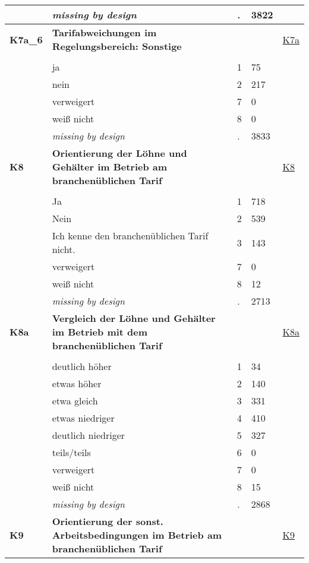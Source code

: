 \begin{longtable}{| L{2.65cm} | L{8cm} | C{1.5cm} | R{1.25cm} | C{2.25cm}  |}
   & \textit{missing by design} & \textit{.} & 3822 &  \\ 
   \midrule
\textbf{K7a\_6}\label{var:K7a:6} & \textbf{Tarifabweichungen im Regelungsbereich: Sonstige} &  &  & \hyperref[K7a]{K7a} \\ 
   &  &  &  &  \\ 
   & ja & 1 & 75 &  \\ 
   & nein & 2 & 217 &  \\ 
   & verweigert & 7 & 0 &  \\ 
   & weiß nicht & 8 & 0 &  \\ 
   & \textit{missing by design} & \textit{.} & 3833 &  \\ 
   \midrule
\textbf{K8}\label{var:K8} & \textbf{Orientierung der Löhne und Gehälter im Betrieb am branchenüblichen Tarif} &  &  & \hyperref[K8]{K8} \\ 
   &  &  &  &  \\ 
   & Ja & 1 & 718 &  \\ 
   & Nein & 2 & 539 &  \\ 
   & Ich kenne den branchenüblichen Tarif nicht. & 3 & 143 &  \\ 
   & verweigert & 7 & 0 &  \\ 
   & weiß nicht & 8 & 12 &  \\ 
   & \textit{missing by design} & \textit{.} & 2713 &  \\ 
   \midrule
\textbf{K8a}\label{var:K8a} & \textbf{Vergleich der Löhne und Gehälter im Betrieb mit dem branchenüblichen Tarif} &  &  & \hyperref[K8a]{K8a} \\ 
   &  &  &  &  \\ 
   & deutlich höher & 1 & 34 &  \\ 
   & etwas höher & 2 & 140 &  \\ 
   & etwa gleich & 3 & 331 &  \\ 
   & etwas niedriger & 4 & 410 &  \\ 
   & deutlich niedriger & 5 & 327 &  \\ 
   & teils/teils & 6 & 0 &  \\ 
   & verweigert & 7 & 0 &  \\ 
   & weiß nicht & 8 & 15 &  \\ 
   & \textit{missing by design} & \textit{.} & 2868 &  \\ 
   \midrule
\textbf{K9}\label{var:K9} & \textbf{Orientierung der sonst. Arbeitsbedingungen im Betrieb am branchenüblichen Tarif} &  &  & \hyperref[K9]{K9} \\ 

\end{longtable}

